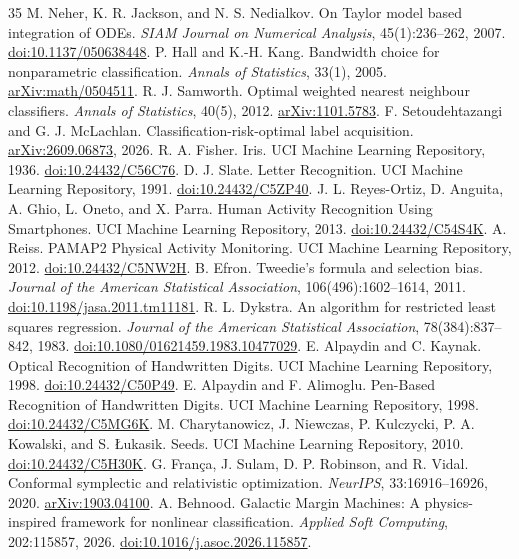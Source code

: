 \documentclass[10pt]{article}
\begin{document}
\begin{thebibliography}{35}
 M. Neher, K. R. Jackson, and N. S. Nedialkov. On Taylor model based integration of ODEs. \emph{SIAM Journal on Numerical Analysis}, 45(1):236--262, 2007. \href{https://doi.org/10.1137/050638448}{doi:10.1137/050638448}.
\ifdefined\ArticleOnly\else
{} P. Hall and K.-H. Kang. Bandwidth choice for nonparametric classification. \emph{Annals of Statistics}, 33(1), 2005. \href{https://arxiv.org/abs/math/0504511}{arXiv:math/0504511}.
\fi
\ifdefined\ArticleOnly\else
{} R. J. Samworth. Optimal weighted nearest neighbour classifiers. \emph{Annals of Statistics}, 40(5), 2012. \href{https://arxiv.org/abs/1101.5783}{arXiv:1101.5783}.
\fi
\ifdefined\ArticleOnly\else
{} F. Setoudehtazangi and G. J. McLachlan. Classification-risk-optimal label acquisition. \href{https://arxiv.org/abs/2609.06873}{arXiv:2609.06873}, 2026.
\fi
{} R. A. Fisher. Iris. UCI Machine Learning Repository, 1936. \href{https://doi.org/10.24432/C56C76}{doi:10.24432/C56C76}.
 D. J. Slate. Letter Recognition. UCI Machine Learning Repository, 1991. \href{https://doi.org/10.24432/C5ZP40}{doi:10.24432/C5ZP40}.
 J. L. Reyes-Ortiz, D. Anguita, A. Ghio, L. Oneto, and X. Parra. Human Activity Recognition Using Smartphones. UCI Machine Learning Repository, 2013. \href{https://doi.org/10.24432/C54S4K}{doi:10.24432/C54S4K}.
 A. Reiss. PAMAP2 Physical Activity Monitoring. UCI Machine Learning Repository, 2012. \href{https://doi.org/10.24432/C5NW2H}{doi:10.24432/C5NW2H}.
 B. Efron. Tweedie's formula and selection bias. \emph{Journal of the American Statistical Association}, 106(496):1602--1614, 2011. \href{https://doi.org/10.1198/jasa.2011.tm11181}{doi:10.1198/jasa.2011.tm11181}.
 R. L. Dykstra. An algorithm for restricted least squares regression. \emph{Journal of the American Statistical Association}, 78(384):837--842, 1983. \href{https://doi.org/10.1080/01621459.1983.10477029}{doi:10.1080/01621459.1983.10477029}.
 E. Alpaydin and C. Kaynak. Optical Recognition of Handwritten Digits. UCI Machine Learning Repository, 1998. \href{https://doi.org/10.24432/C50P49}{doi:10.24432/C50P49}.
 E. Alpaydin and F. Alimoglu. Pen-Based Recognition of Handwritten Digits. UCI Machine Learning Repository, 1998. \href{https://doi.org/10.24432/C5MG6K}{doi:10.24432/C5MG6K}.
\ifdefined\ArticleOnly\else
{} M. Charytanowicz, J. Niewczas, P. Kulczycki, P. A. Kowalski, and S. \L ukasik. Seeds. UCI Machine Learning Repository, 2010. \href{https://doi.org/10.24432/C5H30K}{doi:10.24432/C5H30K}.
\fi
\ifdefined\ArticleOnly\else
{} G. Fran\c{c}a, J. Sulam, D. P. Robinson, and R. Vidal. Conformal symplectic and relativistic optimization. \emph{NeurIPS}, 33:16916--16926, 2020. \href{https://arxiv.org/abs/1903.04100}{arXiv:1903.04100}.
\fi
\ifdefined\ArticleOnly\else
{} A. Behnood. Galactic Margin Machines: A physics-inspired framework for nonlinear classification. \emph{Applied Soft Computing}, 202:115857, 2026. \href{https://doi.org/10.1016/j.asoc.2026.115857}{doi:10.1016/j.asoc.2026.115857}.
\fi
\end{thebibliography}
\end{document}

